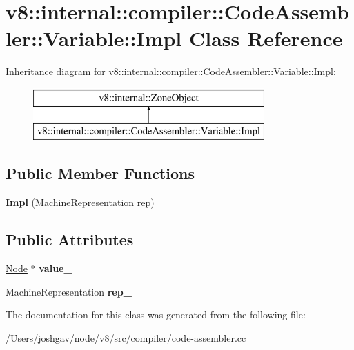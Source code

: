 \hypertarget{classv8_1_1internal_1_1compiler_1_1_code_assembler_1_1_variable_1_1_impl}{}\section{v8\+:\+:internal\+:\+:compiler\+:\+:Code\+Assembler\+:\+:Variable\+:\+:Impl Class Reference}
\label{classv8_1_1internal_1_1compiler_1_1_code_assembler_1_1_variable_1_1_impl}
Inheritance diagram for v8\+:\+:internal\+:\+:compiler\+:\+:Code\+Assembler\+:\+:Variable\+:\+:Impl\+:\begin{figure}[H]
\begin{center}
\leavevmode
\includegraphics[height=2.000000cm]{classv8_1_1internal_1_1compiler_1_1_code_assembler_1_1_variable_1_1_impl}
\end{center}
\end{figure}
\subsection*{Public Member Functions}
\begin{DoxyCompactItemize}
\item 
{\bfseries Impl} (Machine\+Representation rep)\hypertarget{classv8_1_1internal_1_1compiler_1_1_code_assembler_1_1_variable_1_1_impl_a5e09be66fdbfdfaa9854f04caff819b5}{}\label{classv8_1_1internal_1_1compiler_1_1_code_assembler_1_1_variable_1_1_impl_a5e09be66fdbfdfaa9854f04caff819b5}

\end{DoxyCompactItemize}
\subsection*{Public Attributes}
\begin{DoxyCompactItemize}
\item 
\hyperlink{classv8_1_1internal_1_1compiler_1_1_node}{Node} $\ast$ {\bfseries value\+\_\+}\hypertarget{classv8_1_1internal_1_1compiler_1_1_code_assembler_1_1_variable_1_1_impl_a0db61888f4bb8f151e256266ed7ce01f}{}\label{classv8_1_1internal_1_1compiler_1_1_code_assembler_1_1_variable_1_1_impl_a0db61888f4bb8f151e256266ed7ce01f}

\item 
Machine\+Representation {\bfseries rep\+\_\+}\hypertarget{classv8_1_1internal_1_1compiler_1_1_code_assembler_1_1_variable_1_1_impl_aa7be3aab8640071198e204c9bc565c45}{}\label{classv8_1_1internal_1_1compiler_1_1_code_assembler_1_1_variable_1_1_impl_aa7be3aab8640071198e204c9bc565c45}

\end{DoxyCompactItemize}


The documentation for this class was generated from the following file\+:\begin{DoxyCompactItemize}
\item 
/\+Users/joshgav/node/v8/src/compiler/code-\/assembler.\+cc\end{DoxyCompactItemize}
